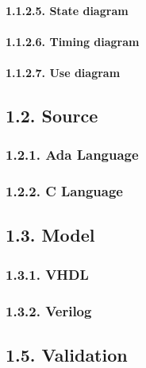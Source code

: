\documentclass[
]{article}
\begin{document}
\hypertarget{state-diagram-1}{%
\paragraph{1.1.2.5. State diagram}\label{state-diagram-1}}

\hypertarget{timing-diagram-1}{%
\paragraph{1.1.2.6. Timing diagram}\label{timing-diagram-1}}

\hypertarget{use-diagram-1}{%
\paragraph{1.1.2.7. Use diagram}\label{use-diagram-1}}

\hypertarget{source-1}{%
\subsection{1.2. Source}\label{source-1}}

\hypertarget{ada-language-1}{%
\subsubsection{1.2.1. Ada Language}\label{ada-language-1}}

\hypertarget{c-language-1}{%
\subsubsection{1.2.2. C Language}\label{c-language-1}}

\hypertarget{model-1}{%
\subsection{1.3. Model}\label{model-1}}

\hypertarget{vhdl-3}{%
\subsubsection{1.3.1. VHDL}\label{vhdl-3}}

\hypertarget{verilog-3}{%
\subsubsection{1.3.2. Verilog}\label{verilog-3}}

\hypertarget{validation-1}{%
\subsection{1.5. Validation}\label{validation-1}}
\end{document}
